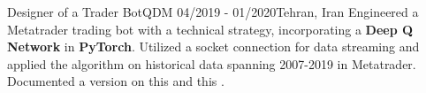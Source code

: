 \resumeSubheadingReza
{Designer of a Trader Bot}{QDM}
{04/2019 - 01/2020}{Tehran, Iran}
{Engineered a Metatrader trading bot with a technical strategy, incorporating a \textbf{Deep Q Network} in \textbf{PyTorch}. Utilized a socket connection for data streaming and applied the algorithm on historical data spanning 2007-2019 in Metatrader. Documented a version on this  and this .}
